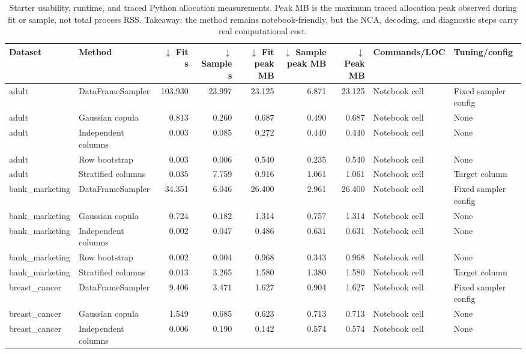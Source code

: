 \begin{table}
\caption{Starter usability, runtime, and traced Python allocation measurements. Peak MB is the maximum traced allocation peak observed during fit or sample, not total process RSS. Takeaway: the method remains notebook-friendly, but the NCA, decoding, and diagnostic steps carry real computational cost.}
\label{tab:usability-runtime}
\begin{adjustbox}{max width=\textwidth}
\begin{tabular}{llrrrrrll}
\toprule
Dataset & Method & $\downarrow$ Fit s & $\downarrow$ Sample s & $\downarrow$ Fit peak MB & $\downarrow$ Sample peak MB & $\downarrow$ Peak MB & Commands/LOC & Tuning/config \\
\midrule
adult & DataFrameSampler & 103.930 & 23.997 & 23.125 & 6.871 & 23.125 & Notebook cell & Fixed sampler config \\
adult & Gaussian copula & 0.813 & 0.260 & 0.687 & 0.490 & 0.687 & Notebook cell & None \\
adult & Independent columns & 0.003 & 0.085 & 0.272 & 0.440 & 0.440 & Notebook cell & None \\
adult & Row bootstrap & 0.003 & 0.006 & 0.540 & 0.235 & 0.540 & Notebook cell & None \\
adult & Stratified columns & 0.035 & 7.759 & 0.916 & 1.061 & 1.061 & Notebook cell & Target column \\
bank\_marketing & DataFrameSampler & 34.351 & 6.046 & 26.400 & 2.961 & 26.400 & Notebook cell & Fixed sampler config \\
bank\_marketing & Gaussian copula & 0.724 & 0.182 & 1.314 & 0.757 & 1.314 & Notebook cell & None \\
bank\_marketing & Independent columns & 0.002 & 0.047 & 0.486 & 0.631 & 0.631 & Notebook cell & None \\
bank\_marketing & Row bootstrap & 0.002 & 0.004 & 0.968 & 0.343 & 0.968 & Notebook cell & None \\
bank\_marketing & Stratified columns & 0.013 & 3.265 & 1.580 & 1.380 & 1.580 & Notebook cell & Target column \\
breast\_cancer & DataFrameSampler & 9.406 & 3.471 & 1.627 & 0.904 & 1.627 & Notebook cell & Fixed sampler config \\
breast\_cancer & Gaussian copula & 1.549 & 0.685 & 0.623 & 0.713 & 0.713 & Notebook cell & None \\
breast\_cancer & Independent columns & 0.006 & 0.190 & 0.142 & 0.574 & 0.574 & Notebook cell & None \\

\end{tabular}
\end{adjustbox}
\end{table}
